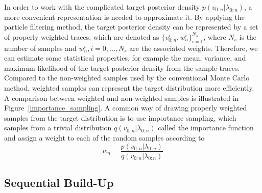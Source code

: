 In order to work with the complicated target posterior density $p({v_{0:n}}|{\lambda_{0:n}})$, a more convenient representation is needed to approximate it. By applying the particle filtering method, the target posterior density can be represented by a set of properly weighted traces, which are denoted as $\{ v_{0:n}^i,w_n^i\} _{i = 1}^{{N_s}}$, where $N_s$ is the number of samples and $ w_n^i,i = 0,...,{N_s} $ are the associated weights. Therefore, we can estimate some statistical properties, for example the mean, variance, and maximum likelihood of the target posterior density from the sample traces. Compared to the non-weighted samples used by the conventional Monte Carlo method, weighted samples can represent the target distribution more efficiently. A comparison between weighted and non-weighted samples is illustrated in Figure~\ref{importance_sampling}. A common way of drawing properly weighted samples from the target distribution is to use importance sampling, which samples from a trivial distribution $q({v_{0:n}}|{\lambda_{0:n}})$ called the importance function and assign a weight to each of the random samples according to
\begin{equation}
  w_n = \frac{{p({v_{0:n}}|{\lambda_{0:n}})}}{{q({v_{0:n}}|{\lambda_{0:n}})}}
\end{equation}

\subsection{Sequential Build-Up}


